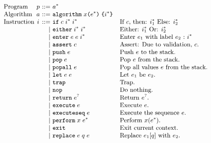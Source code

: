 \begin{figure}[t]
\[
\small
\begin{array}{l@{~}c@{~}r@{~}lll}
\text{Program} & \prog &::=& \alg^*\\
\text{Algorithm} & \alg &::=&
\kwalg \; \varx \kwrl \expr^* \kwrr \; \kwcl \inst^* \kwcr \\
\text{Instruction} & \inst &::=&
    \kwif \; \cond \; \inst^* \; \inst^* & \mbox{If $\cond$, then: $\inst_1^*$ Else: $\inst_2^*$}\\
&& \mid&
  \kweither \; \inst^* \; \inst^* & \mbox{Either: $\inst_1^*$ Or: $\inst_2^*$}\\
&& \mid&
  \kwenter \; \expr \; \expr \; \inst^* & \mbox{Enter $\expr_1$ with label $\expr_2$\ :\ $\inst^*$}\\
&& \mid&
  \kwassert \; \cond  & \mbox{Assert: Due to validation, $\cond$.}\\
&& \mid&
  \kwpush \; \expr  & \mbox{Push $\expr$ to the stack.}\\
&& \mid&
  \kwpop \; \expr  & \mbox{Pop $\expr$ from the stack.}\\
&& \mid&
  \kwpopall \; \expr  & \mbox{Pop all values $\expr$ from the stack.}\\
&& \mid&
  \kwlet \; \expr \; \expr & \mbox{Let $\expr_1$ be $\expr_2$.}\\
&& \mid&
  \kwtrap & \mbox{Trap.}\\
&& \mid&
  \kwnop & \mbox{Do nothing.}\\
&& \mid&
  \kwreturn \; \expr^? & \mbox{Return $\expr^?$.}\\
&& \mid&
  \kwexecute \; \expr & \mbox{Execute $\expr$.}\\
&& \mid&
  \kwexecuteseq \; \expr & \mbox{Execute the sequence $\expr$.}\\
&& \mid&
  \kwperform \; \varx \; \expr^* & \mbox{Perform $\varx(\expr^*)$.}\\
&& \mid&
  \kwexit & \mbox{Exit current context.}\\
&& \mid&
    \kwreplace \; \expr \; \qual \; \expr & \mbox{Replace $\expr_1[\qual]$ with $\expr_2$.}
\\


\end{array}\]
\end{figure}
